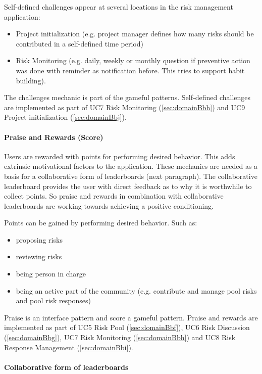 \noindent
Self-defined challenges appear at several locations in the risk management application:
\begin{itemize}
	\item Project initialization (e.g. project manager defines how many risks should be contributed in a self-defined time period)
	\item Risk Monitoring (e.g. daily, weekly or monthly question if preventive action was done with reminder as notification before. This tries to support habit building).
\end{itemize}

The challenges mechanic is part of the gameful patterns. 
Self-defined challenges are implemented as part of \ac{UC}7 Risk Monitoring (\ref{sec:domainBbh}) and \ac{UC}9 Project initialization (\ref{sec:domainBbj}).

\paragraph*{Praise and Rewards (Score)}

Users are rewarded with points for performing desired behavior. This adds extrinsic motivational factors to the application. These mechanics are needed as a basis for a collaborative form of leaderboards (next paragraph). The collaborative leaderboard provides the user with direct feedback as to why it is worthwhile to collect points. So praise and rewards in combination with collaborative leaderboards are working towards achieving a positive conditioning.

Points can be gained by performing desired behavior. Such as:
\begin{itemize}
	\item proposing risks
	\item reviewing risks
	\item being person in charge
	\item being an active part of the community (e.g. contribute and manage pool risks and pool risk responses)
\end{itemize}

Praise is an interface pattern and score a gameful pattern.
Praise and rewards are implemented as part of \ac{UC}5 Risk Pool (\ref{sec:domainBbf}), \ac{UC}6 Risk Discussion (\ref{sec:domainBbg}), \ac{UC}7 Risk Monitoring (\ref{sec:domainBbh}) and \ac{UC}8 Risk Response Management (\ref{sec:domainBbi}).

\paragraph*{Collaborative form of leaderboards}

